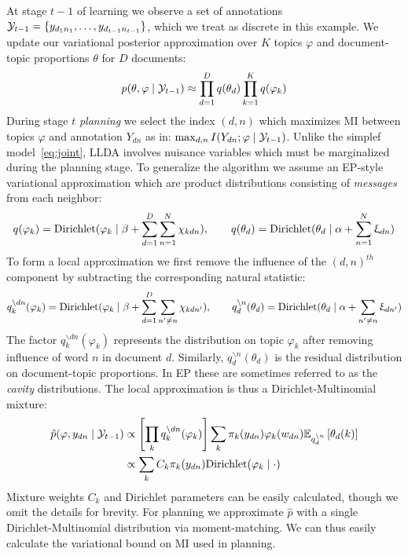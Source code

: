 \documentclass{article}
\begin{document}
At stage $t-1$ of learning we observe a set of annotations
$\mathcal{Y}_{t-1} = \{ y_{d_1 n_1}, \ldots, y_{d_{t-1} n_{t-1}}\}$, which
we treat as discrete in this example.  We update our variational
posterior approximation over $K$ topics $\varphi$ and document-topic
proportions $\theta$ for $D$ documents:
\begin{equation}
  p(\theta, \varphi \mid \mathcal{Y}_{t-1}) \approx \prod_{d=1}^D q(\theta_d)
  \prod_{k=1}^K q(\varphi_k)
\end{equation}
During stage $t$ \emph{planning} we select the index $(d,n)$ which
maximizes MI between topics $\varphi$ and annotation $Y_{dn}$ as in:
$\max_{d,n} I(Y_{dn}; \varphi \mid \mathcal{Y}_{t-1})$.  Unlike the simplef
model~\eqref{eq:joint}, LLDA involves nuisance variables which must be
marginalized during the planning stage.  To generalize the algorithm
we assume an EP-style variational approximation which are product
distributions consisting of \emph{messages} from each neighbor:
\begin{equation}
  q(\varphi_k) = \text{Dirichlet}( \varphi_k \mid \beta + \sum_{d=1}^D
  \sum_{n=1}^N \chi_{kdn} ), \qquad
  q(\theta_d) = \text{Dirichlet}( \theta_d \mid \alpha + \sum_{n=1}^N \upxi_{dn} )
\end{equation}
To form a local approximation we first remove the influence of the
$(d,n)^{th}$ component by subtracting the corresponding natural statistic:
\begin{equation}
   q_k^{\backslash dn}(\varphi_k) = \text{Dirichlet}( \varphi_k \mid \beta +
   \sum_{d=1}^D \sum_{n' \neq n} \chi_{kdn'} ), \qquad
   q_d^{\backslash n}(\theta_d) = \text{Dirichlet}( \theta_d \mid \alpha + \sum_{n' \neq n}
   \upxi_{dn'} )
\end{equation}
The factor $q_k^{\backslash dn}(\varphi_k)$ represents the
distribution on topic $\varphi_k$ after removing influence of word $n$
in document $d$.  Similarly, $q_d^{\backslash n}(\theta_d)$ is the
residual distribution on document-topic proportions.  In EP these are
sometimes referred to as the \emph{cavity} distributions.  The local
approximation is thus a Dirichlet-Multinomial mixture:
\begin{align}
  \hat{p}(\varphi, y_{dn} \mid \mathcal{Y}_{t-1}) &\propto \left[ \prod_k
        q_k^{\backslash dn}(\varphi_k) \right] \sum_k \pi_k(y_{dn})
        \varphi_k(w_{dn}) \mathbb{E}_{q_d^{\backslash n}} \left[ \theta_d(k)
      \right] \\
  &\propto \sum_k C_k \pi_k(y_{dn}) \text{Dirichlet}( \varphi_k \mid \cdot )
\end{align}
Mixture weights $C_k$ and Dirichlet parameters can be easily
calculated, though we omit the details for brevity.  For planning we
approximate $\hat{p}$ with a single Dirichlet-Multinomial distribution
via moment-matching.  We can thus easily calculate the variational
bound on MI used in planning.
\end{document}
